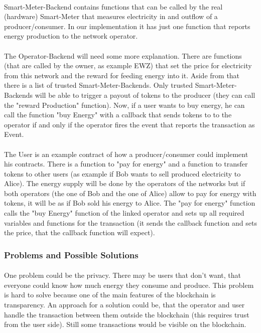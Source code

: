 \documentclass{scrartcl}
\begin{document}
	\paragraph{}
	Smart-Meter-Backend contains functions that can be called by the real (hardware) Smart-Meter that measures electricity in and outflow of a producer/consumer. In our implementation it has just one function that reports energy production to the network operator.
	
	\paragraph{}
	The Operator-Backend will need some more explanation. There are functions (that are called by the owner, as example EWZ) that set the price for electricity from this network and the reward for feeding energy into it. Aside from that there is a list of trusted Smart-Meter-Backends. Only trusted Smart-Meter-Backends will be able to trigger a payout of tokens to the producer (they can call the "reward Production" function). Now, if a user wants to buy energy, he can call the function "buy Energy" with a callback that sends tokens to to the operator if and only if the operator fires the event that reports the transaction as Event.
	
	\paragraph{}
	The User is an example contract of how a producer/consumer could implement his contracts. There is a function to "pay for energy" and a function to transfer tokens to other users (as example if Bob wants to sell produced electricity to Alice). The energy supply will be done by the operators of the networks but if both operators (the one of Bob and the one of Alice) allow to pay for energy with tokens, it will be as if Bob sold his energy to Alice. The "pay for energy" function calls the "buy Energy" function of the linked operator and sets up all required variables and functions for the transaction (it sends the callback function and sets the price, that the callback function will expect).
	
	\subsubsection{Problems and Possible Solutions}
	
	\paragraph{}
	One problem could be the privacy. There may be users that don’t want, that everyone could know how much energy they consume and produce. This problem is hard to solve because one of the main features of the blockchain is transparency. An approach for a solution could be, that the operator and user handle the transaction between them outside the blockchain (this requires trust from the user side). Still some transactions would be visible on the blockchain.
	
\end{document}
